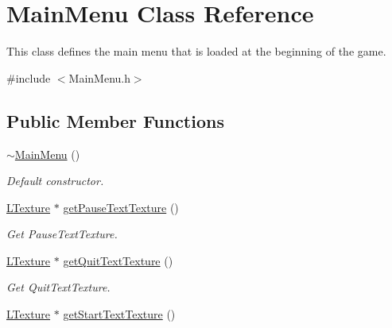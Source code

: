 \hypertarget{class_main_menu}{}\section{Main\+Menu Class Reference}
\label{class_main_menu}


This class defines the main menu that is loaded at the beginning of the game.  




{\ttfamily \#include $<$Main\+Menu.\+h$>$}

\subsection*{Public Member Functions}
\begin{DoxyCompactItemize}
\item 
\mbox{\label{class_main_menu_a0a19ddba3ac52bf39c09b579171c98f2}} 
\mbox{\hyperlink{class_main_menu_a0a19ddba3ac52bf39c09b579171c98f2}{$\sim$\+Main\+Menu}} ()
\begin{DoxyCompactList}\small\item\em Default constructor. \end{DoxyCompactList}\item 
\mbox{\label{class_main_menu_a981502d344d9e1b2c4a48c7460d9fcfd}} 
\mbox{\hyperlink{class_l_texture}{L\+Texture}} $\ast$ \mbox{\hyperlink{class_main_menu_a981502d344d9e1b2c4a48c7460d9fcfd}{get\+Pause\+Text\+Texture}} ()
\begin{DoxyCompactList}\small\item\em Get Pause\+Text\+Texture. \end{DoxyCompactList}\item 
\mbox{\label{class_main_menu_a0423a7a957fc0b3925a56e49270610f0}} 
\mbox{\hyperlink{class_l_texture}{L\+Texture}} $\ast$ \mbox{\hyperlink{class_main_menu_a0423a7a957fc0b3925a56e49270610f0}{get\+Quit\+Text\+Texture}} ()
\begin{DoxyCompactList}\small\item\em Get Quit\+Text\+Texture. \end{DoxyCompactList}\item 
\mbox{\label{class_main_menu_af31959a4dd175946985c323948b6afb1}} 
\mbox{\hyperlink{class_l_texture}{L\+Texture}} $\ast$ \mbox{\hyperlink{class_main_menu_af31959a4dd175946985c323948b6afb1}{get\+Start\+Text\+Texture}} ()

\end{DoxyCompactItemize}
